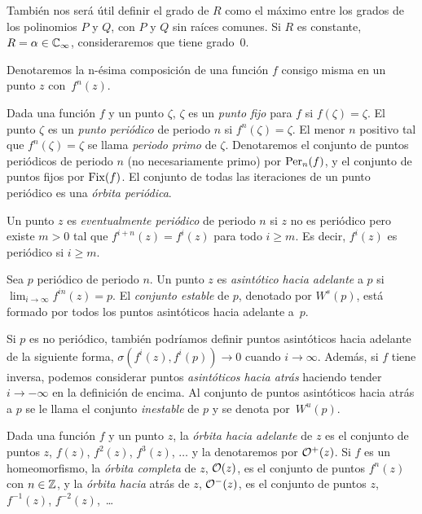 También nos será útil definir el grado de $R$ como el máximo entre los grados
de los polinomios $P$ y $Q$, con $P$ y $Q$ sin raíces comunes. Si $R$ es
constante, $R = \alpha \in \mathbb{C}_\infty$, consideraremos que tiene grado~$0$.

Denotaremos la n-ésima composición de una función $f$ consigo misma en un punto
$z$ con~$f^n(z)$.

\begin{definicion}
  Dada una función $f$ y un punto $\zeta$, $\zeta$ es un \emph{punto fijo} para
  $f$ si $f(\zeta) = \zeta$. El punto $\zeta$ es un \emph{punto periódico} de
  periodo $n$ si $f^n(\zeta) = \zeta$. El menor $n$ positivo tal que
  $f^n(\zeta) = \zeta$ se llama \emph{periodo primo} de $\zeta$. Denotaremos el
  conjunto de puntos periódicos de periodo $n$ (no necesariamente primo) por
  $\mathrm{Per}_{n}(f)$, y el conjunto de puntos fijos por $\mathrm{Fix}(f)$.
  El conjunto de todas las iteraciones de un punto periódico es una
  \emph{órbita periódica}.
\end{definicion}

\begin{definicion}
  Un punto $z$ es \emph{eventualmente periódico} de periodo $n$ si $z$ no es
  periódico pero existe $m > 0$ tal que $f^{i+n}(z) = f^i(z)$ para todo $i \geq
  m$. Es decir, $f^i(z)$ es periódico si $i \geq m$.
\end{definicion}

\begin{definicion}
  Sea $p$ periódico de periodo $n$. Un punto $z$ es \emph{asintótico hacia
  adelante} a $p$ si $\lim_{i \to \infty} f^{in}(z) = p$. El \emph{conjunto
  estable} de $p$, denotado por $W^s(p)$, está formado por todos los puntos
  asintóticos hacia adelante a~$p$.
\end{definicion}

Si $p$ es no periódico, también podríamos definir puntos asintóticos hacia
adelante de la siguiente forma, $\sigma(f^i(z), f^i(p)) \to 0$ cuando $i \to
\infty$. Además, si $f$ tiene inversa, podemos considerar puntos
\emph{asintóticos hacia atrás} haciendo tender $i \to -\infty$ en la definición
de encima. Al conjunto de puntos asintóticos hacia atrás a $p$ se le llama el
conjunto \emph{inestable} de $p$ y se denota por~$W^u(p)$.

\begin{definicion}
  Dada una función $f$ y un punto $z$, la \emph{órbita hacia adelante} de $z$
  es el conjunto de puntos $z$, $f(z)$, $f^2(z)$, $f^3(z)$, $\ldots$ y la
  denotaremos por $\mathcal{O}^+(z)$. Si $f$ es un homeomorfismo, la \emph{órbita
  completa} de $z$, $\mathcal{O}(z)$, es el conjunto de puntos $f^n(z)$ con $n \in
  \mathbb{Z}$, y la \emph{órbita hacia} atrás de $z$, $\mathcal{O}^-(z)$, es el conjunto de
  puntos $z$, $f^{-1}(z)$, $f^{-2}(z)$,~\dots
\end{definicion}

